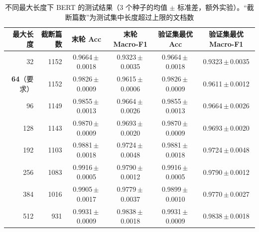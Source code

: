 \documentclass[lang=cn,a4paper]{elegantpaper}
\newcommand{\pmstd}[2]{#1\,$\pm$\,#2}
\begin{document}
\begin{table}[htbp]
  \centering
  \caption{不同最大长度下 BERT 的测试结果（3 个种子的均值 $\pm$ 标准差，额外实验）。“截断篇数”为测试集中长度超过上限的文档数}
  \label{tab:bert-len}
  \small
  \begin{tabular}{rrcccc}
    \toprule
    最大长度 & 截断篇数 & 末轮 Acc & 末轮 Macro-F1 & 验证集最优 Acc & 验证集最优 Macro-F1 \\
    \midrule
    32 & 1152 & \pmstd{0.9664}{0.0018} & \pmstd{0.9323}{0.0035} & \pmstd{0.9664}{0.0018} & \pmstd{0.9323}{0.0035} \\
    \textbf{64}（要求） & 1152 & \pmstd{0.9826}{0.0009} & \pmstd{0.9615}{0.0006} & \pmstd{0.9826}{0.0009} & \pmstd{0.9611}{0.0012} \\
    96 & 1149 & \pmstd{0.9855}{0.0013} & \pmstd{0.9664}{0.0026} & \pmstd{0.9855}{0.0013} & \pmstd{0.9664}{0.0026} \\
    128 & 1143 & \pmstd{0.9870}{0.0009} & \pmstd{0.9693}{0.0020} & \pmstd{0.9870}{0.0009} & \pmstd{0.9693}{0.0020} \\
    192 & 1103 & \pmstd{0.9881}{0.0018} & \pmstd{0.9724}{0.0048} & \pmstd{0.9881}{0.0018} & \pmstd{0.9724}{0.0048} \\
    256 & 1083 & \pmstd{0.9916}{0.0005} & \pmstd{0.9790}{0.0012} & \pmstd{0.9916}{0.0005} & \pmstd{0.9790}{0.0012} \\
    384 & 1016 & \pmstd{0.9905}{0.0017} & \pmstd{0.9779}{0.0037} & \pmstd{0.9899}{0.0010} & \pmstd{0.9770}{0.0027} \\
    512 & 931 & \pmstd{0.9931}{0.0009} & \pmstd{0.9838}{0.0018} & \pmstd{0.9931}{0.0009} & \pmstd{0.9838}{0.0018} \\
    \bottomrule
  \end{tabular}
\end{table}
\end{document}
